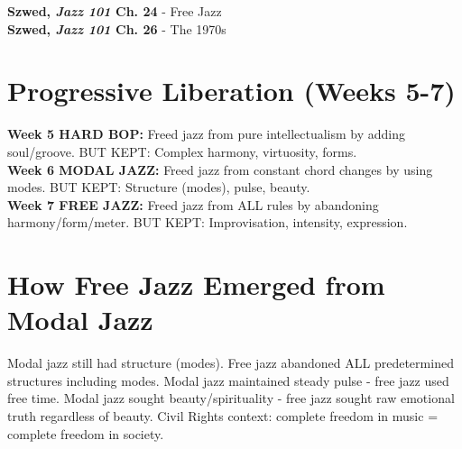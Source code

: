 \documentclass[11pt]{article}
\begin{document}
\textbf{Szwed, \emph{Jazz 101} Ch. 24} - Free Jazz \\
\textbf{Szwed, \emph{Jazz 101} Ch. 26} - The 1970s

\section*{Progressive Liberation (Weeks 5-7)}

\textbf{Week 5 HARD BOP:} Freed jazz from pure intellectualism by adding soul/groove. BUT KEPT: Complex harmony, virtuosity, forms. \\
\textbf{Week 6 MODAL JAZZ:} Freed jazz from constant chord changes by using modes. BUT KEPT: Structure (modes), pulse, beauty. \\
\textbf{Week 7 FREE JAZZ:} Freed jazz from ALL rules by abandoning harmony/form/meter. BUT KEPT: Improvisation, intensity, expression.

\section*{How Free Jazz Emerged from Modal Jazz}

Modal jazz still had structure (modes). Free jazz abandoned ALL predetermined structures including modes. Modal jazz maintained steady pulse - free jazz used free time. Modal jazz sought beauty/spirituality - free jazz sought raw emotional truth regardless of beauty. Civil Rights context: complete freedom in music = complete freedom in society.
\end{document}
